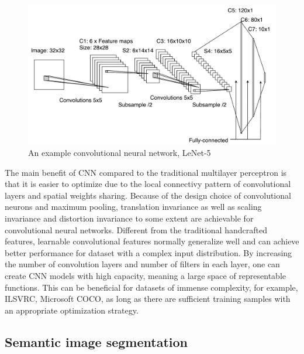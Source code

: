 \begin{figure}[t]
\centering
   \includegraphics[width=\linewidth]{img/lenet}
\caption{An example convolutional neural network, LeNet-5\cite{lecun1998gradient}}
\label{fig:lenet}
\end{figure}

The main benefit of CNN compared to the traditional multilayer perceptron is that it is easier to optimize due to the local connectivy pattern of convolutional layers and spatial weights sharing.
Because of the design choice of convolutional neurons and maximum pooling, translation invariance as well as scaling invariance and distortion invariance to some extent are achievable for convolutional neural networks.\cite{lecun1998gradient}
Different from the traditional handcrafted features, learnable convolutional features normally generalize well and can achieve better performance for dataset with a complex input distribution.\cite{krizhevsky2012imagenet}
By increasing the number of convolution layers and number of filters in each layer, one can create CNN models with high capacity, meaning a large space of representable functions.
This can be beneficial for datasets of immense complexity, for example, ILSVRC\cite{russakovsky2015imagenet}, Microsoft COCO\cite{lin2014microsoft}, as long as there are sufficient training samples with an appropriate optimization strategy.


\subsection{Semantic image segmentation}

